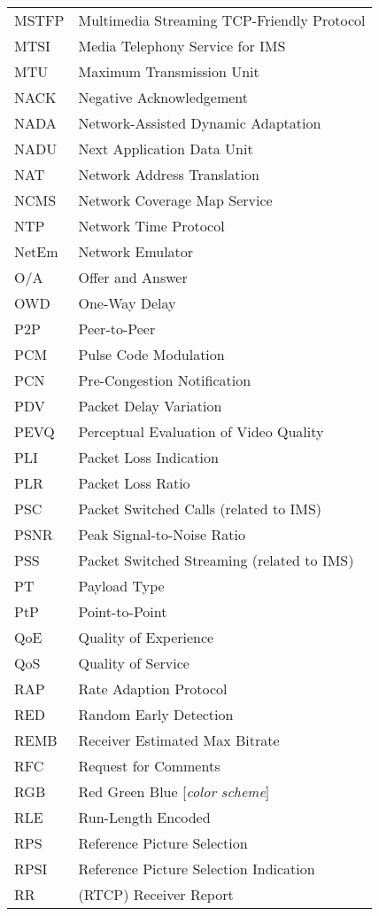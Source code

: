 \begin{longtable}{ll}
MSTFP 	& Multimedia Streaming TCP-Friendly Protocol \\
MTSI 	& Media Telephony Service for IMS\\
MTU  	& Maximum Transmission Unit \\
NACK 	& Negative Acknowledgement \\
NADA 	& Network-Assisted Dynamic Adaptation \\
NADU 	& Next Application Data Unit \\
NAT 	& Network Address Translation \\
NCMS 	& Network Coverage Map Service\\
NTP  	& Network Time Protocol \\
NetEm 	& Network Emulator \\
O/A  	& Offer and Answer \\
OWD 	& One-Way Delay \\
P2P 	& Peer-to-Peer \\
PCM 	& Pulse Code Modulation \\
PCN 	& Pre-Congestion Notification \\
PDV 	& Packet Delay Variation \\
PEVQ 	& Perceptual Evaluation of Video Quality \\
PLI 	& Packet Loss Indication \\
PLR 	& Packet Loss Ratio \\
PSC 	& Packet Switched Calls (related to IMS)\\
PSNR	& Peak Signal-to-Noise Ratio \\
PSS 	& Packet Switched Streaming (related to IMS)\\
PT  	& Payload Type \\
PtP 	& Point-to-Point \\
QoE 	& Quality of Experience \\
QoS 	& Quality of Service \\
RAP 	& Rate Adaption Protocol \\
RED 	& Random Early Detection \\
REMB 	& Receiver Estimated Max Bitrate \\
RFC 	& Request for Comments \\
RGB 	& Red Green Blue [\textit{color scheme}] \\
RLE 	& Run-Length Encoded \\
RPS 	& Reference Picture Selection \\
RPSI 	& Reference Picture Selection Indication \\
RR  	& (RTCP) Receiver Report \\

\end{longtable}
